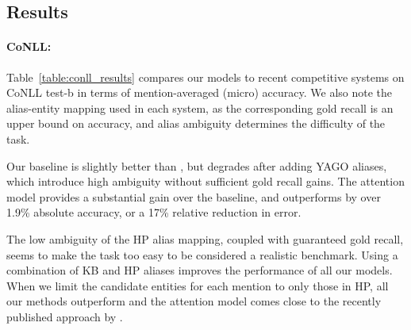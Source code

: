 \subsection{Results}

\paragraph*{CoNLL:}
Table~\ref{table:conll_results} compares our models to recent
competitive systems on CoNLL test-b in terms of mention-averaged (micro)
accuracy.  We also note the alias-entity mapping used in each
system, as the corresponding gold recall is an upper bound on
accuracy, and alias ambiguity determines the difficulty of the task.

Our baseline is slightly better than , but degrades
after adding YAGO aliases, which introduce high ambiguity without sufficient
gold recall gains. The attention model provides a substantial gain over
the baseline, and outperforms  by over
1.9\% absolute accuracy, or a 17\% relative reduction in error.

The low ambiguity of the HP alias mapping, coupled with
guaranteed gold recall, seems to make the task too easy to be
considered a realistic benchmark. Using a combination of KB and HP
aliases improves the performance of all our models. When we limit
the candidate entities for each mention to only those in HP,
all our methods outperform  and the
attention model comes close to the recently published approach by
.

